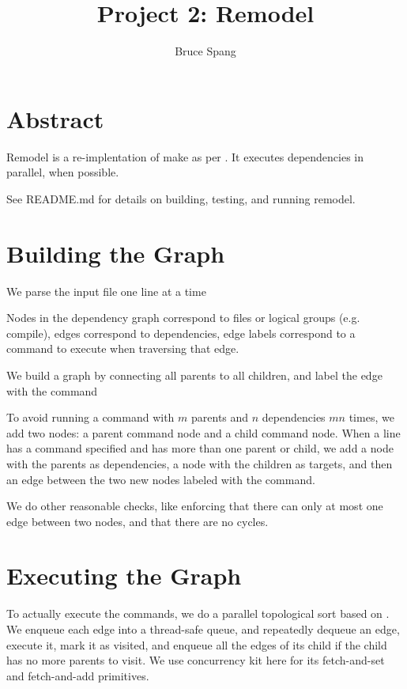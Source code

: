 \documentclass{article}
\begin{document}
\title{Project 2: Remodel}
\author{Bruce Spang}
\maketitle

\section{Abstract}

Remodel is a re-implentation of make \cite{make} as per \cite{assignment}. It executes dependencies in parallel, when possible.

See README.md for details on building, testing, and running remodel.

\section{Building the Graph}

We parse the input file one line at a time

Nodes in the dependency graph correspond to files or logical groups (e.g. compile), edges correspond to dependencies, edge labels correspond to a command to execute when traversing that edge.

We build a graph by connecting all parents to all children, and label the edge with the command

To avoid running a command with $m$ parents and $n$ dependencies $mn$ times, we add two nodes: a parent command node and a child command node. When a line has a command specified and has more than one parent or child, we add a node with the parents as dependencies, a node with the children as targets, and then an edge between the two new nodes labeled with the command.

We do other reasonable checks, like enforcing that there can only at most one edge between two nodes, and that there are no cycles.

\section{Executing the Graph}

To actually execute the commands, we do a parallel topological sort based on \cite{topo}. We enqueue each edge into a thread-safe queue, and repeatedly dequeue an edge, execute it, mark it as visited, and enqueue all the edges of its child if the child has no more parents to visit. We use concurrency kit here for its fetch-and-set and fetch-and-add primitives.
\end{document}
